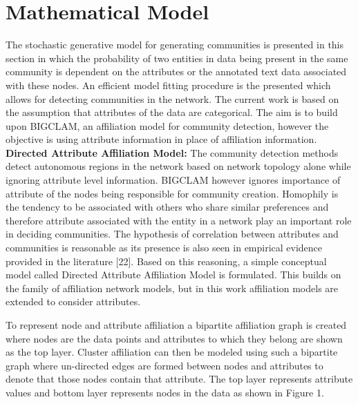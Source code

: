 \documentclass[conference]{IEEEtran}
\begin{document}

\section{Mathematical Model}
The stochastic generative model for generating communities
is presented in this section in which the probability of two
entities in data being present in the same community is
dependent on the attributes or the annotated text data
associated with these nodes. An efficient model fitting
procedure is the presented which allows for detecting
communities in the network. The current work is based on
the assumption that attributes of the data are categorical. The aim is to build upon BIGCLAM, an affiliation model for
community detection, however the objective is using attribute
information in place of affiliation information.\\

\textbf{Directed Attribute Affiliation Model:} The community
detection methods detect autonomous regions in the network
based on network topology alone while ignoring attribute
level information. BIGCLAM however ignores importance
of attribute of the nodes being responsible for community
creation. Homophily is the tendency to be associated with
others who share similar preferences and therefore attribute
associated with the entity in a network play an important
role in deciding communities. The hypothesis of correlation
between attributes and communities is reasonable as its
presence is also seen in empirical evidence provided in
the literature [22]. Based on this reasoning, a simple
conceptual model called Directed Attribute Affiliation Model
is formulated. This builds on the family of affiliation network
models, but in this work affiliation models are extended to
consider attributes.

To represent node and attribute affiliation a bipartite
affiliation graph is created where nodes are the data points
and attributes to which they belong are shown as the top
layer. Cluster affiliation can then be modeled using such a
bipartite graph where un-directed edges are formed between
nodes and attributes to denote that those nodes contain
that attribute. The top layer represents attribute values and
bottom layer represents nodes in the data as shown in Figure 1.
\end{document}
